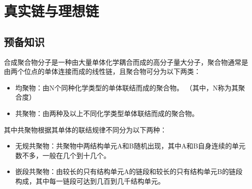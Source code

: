 
\section{真实链与理想链}
\subsection{预备知识}
合成聚合物分子是一种由大量单体化学耦合而成的高分子量大分子，聚合物通常是由两个位点的单体连接而成的线性链，且聚合物可分为以下两类：
\begin{itemize}
	\item 均聚物：由N个同种化学类型的单体联结而成的聚合物。
	（其中，N称为其聚合度）
	\item 共聚物：由两种及以上不同化学类型单体联结而成的聚合物。
\end{itemize}
其中共聚物根据其单体的联结规律不同分为以下两种：
\begin{itemize}
	\item 无规共聚物：共聚物中两结构单元A和B随机出现，其中A和B自身连续的单元数不多，一般在几个到十几个。
	\item 嵌段共聚物：由较长的只有结构单元A的链段和较长的只有结构单元B的链段构成，其中每一链段可达到几百到几千结构单元。
\end{itemize}

